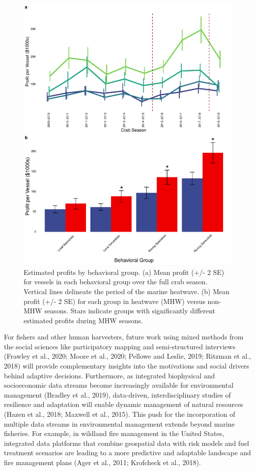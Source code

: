 \documentclass[]{elsarticle} %
\begin{document}
\begin{figure}%
\includegraphics[width=\linewidth]{fig_profits.pdf}
\caption{Estimated profits by behavioral group. (a) Mean profit (+/- 2 SE) for vessels in each behavioral group over the full crab season. Vertical lines delineate the period of the marine heatwave. (b) Mean profit (+/- 2 SE) for each group in heatwave (MHW) versus non-MHW seasons. Stars indicate groups with significantly different estimated profits during MHW seasons.}
\label{fig:profits}
\end{figure}

For fishers and other human harvesters, future work using mixed methods
from the social sciences like participatory mapping and semi-structured
interviews (Frawley et al., 2020; Moore et al., 2020; Pellowe and
Leslie, 2019; Ritzman et al., 2018) will provide complementary insights
into the motivations and social drivers behind adaptive decisions.
Furthermore, as integrated biophysical and socioeconomic data streams
become increasingly available for environmental management (Bradley et
al., 2019), data-driven, interdisciplinary studies of resilience and
adaptation will enable dynamic management of natural resources (Hazen et
al., 2018; Maxwell et al., 2015). This push for the incorporation of
multiple data streams in environmental management extends beyond marine
fisheries. For example, in wildland fire management in the United
States, integrated data platforms that combine geospatial data with risk
models and fuel treatment scenarios are leading to a more predictive and
adaptable landscape and fire management plans (Ager et al., 2011;
Krofcheck et al., 2018).
\end{document}
